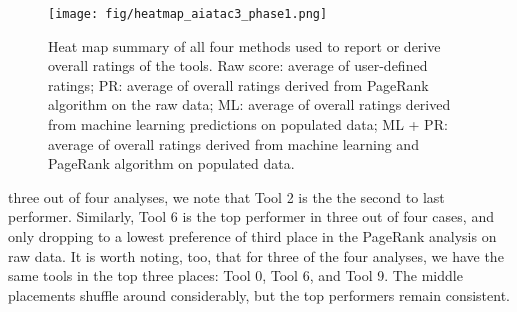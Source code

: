 \begin{wrapfigure}[17]{l}{0.58\textwidth}
    \vspace{-6mm}
    \centering
    \texttt{[image: fig/heatmap\_aiatac3\_phase1.png]}
    \captionsetup{font = scriptsize}
    \vspace{-10pt}
    \caption{Heat map summary of all four methods used to report or derive overall ratings of the tools. Raw score: average of user-defined ratings; PR: average of overall ratings derived from PageRank algorithm on the raw data; ML: average of overall ratings derived from machine learning predictions on populated data; ML + PR: average of overall ratings derived from machine learning and PageRank algorithm on populated data.}
    \label{fig: Heatmap}
\end{wrapfigure}
\noindent three out of four analyses, we note that Tool 2 is the the second to last performer. Similarly, Tool 6 is the top performer in three out of four cases, and only dropping to a lowest preference of third place in the PageRank analysis on raw data. It is worth noting, too, that for three of the four analyses, we have the same tools in the top three places: Tool 0, Tool 6, and Tool 9. The middle placements shuffle around considerably, but the top performers remain consistent. 
